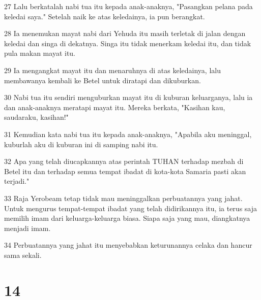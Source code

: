 \par 27 Lalu berkatalah nabi tua itu kepada anak-anaknya, "Pasangkan pelana pada keledai saya." Setelah naik ke atas keledainya, ia pun berangkat.
\par 28 Ia menemukan mayat nabi dari Yehuda itu masih terletak di jalan dengan keledai dan singa di dekatnya. Singa itu tidak menerkam keledai itu, dan tidak pula makan mayat itu.
\par 29 Ia mengangkat mayat itu dan menaruhnya di atas keledainya, lalu membawanya kembali ke Betel untuk diratapi dan dikuburkan.
\par 30 Nabi tua itu sendiri menguburkan mayat itu di kuburan keluarganya, lalu ia dan anak-anaknya meratapi mayat itu. Mereka berkata, "Kasihan kau, saudaraku, kasihan!"
\par 31 Kemudian kata nabi tua itu kepada anak-anaknya, "Apabila aku meninggal, kuburlah aku di kuburan ini di samping nabi itu.
\par 32 Apa yang telah diucapkannya atas perintah TUHAN terhadap mezbah di Betel itu dan terhadap semua tempat ibadat di kota-kota Samaria pasti akan terjadi."
\par 33 Raja Yerobeam tetap tidak mau meninggalkan perbuatannya yang jahat. Untuk mengurus tempat-tempat ibadat yang telah didirikannya itu, ia terus saja memilih imam dari keluarga-keluarga biasa. Siapa saja yang mau, diangkatnya menjadi imam.
\par 34 Perbuatannya yang jahat itu menyebabkan keturunannya celaka dan hancur sama sekali.

\chapter{14}

